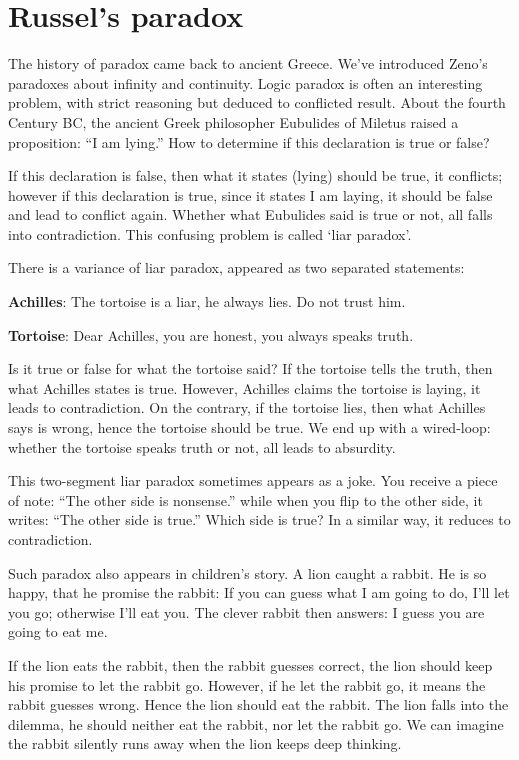 \documentclass[b5paper]{article}
\begin{document}
\section{Russel's paradox}

The history of paradox came back to ancient Greece. We've introduced Zeno's paradoxes about infinity and continuity. Logic paradox is often an interesting problem, with strict reasoning but deduced to conflicted result. About the fourth Century BC, the ancient Greek philosopher Eubulides of Miletus raised a proposition: ``I am lying.'' How to determine if this declaration is true or false?

If this declaration is false, then what it states (lying) should be true, it conflicts; however if this declaration is true, since it states I am laying, it should be false and lead to conflict again. Whether what Eubulides said is true or not, all falls into contradiction. This confusing problem is called `liar paradox'.

There is a variance of liar paradox, appeared as two separated statements:

\textbf{Achilles}: The tortoise is a liar, he always lies. Do not trust him.

\textbf{Tortoise}: Dear Achilles, you are honest, you always speaks truth.

Is it true or false for what the tortoise said? If the tortoise tells the truth, then what Achilles states is true. However, Achilles claims the tortoise is laying, it leads to contradiction. On the contrary, if the tortoise lies, then what Achilles says is wrong, hence the tortoise should be true. We end up with a wired-loop: whether the tortoise speaks truth or not, all leads to absurdity.

This two-segment liar paradox sometimes appears as a joke. You receive a piece of note: ``The other side is nonsense.'' while when you flip to the other side, it writes: ``The other side is true.'' Which side is true? In a similar way, it reduces to contradiction.

Such paradox also appears in children's story. A lion caught a rabbit. He is so happy, that he promise the rabbit: If you can guess what I am going to do, I'll let you go; otherwise I'll eat you. The clever rabbit then answers: I guess you are going to eat me.

If the lion eats the rabbit, then the rabbit guesses correct, the lion should keep his promise to let the rabbit go. However, if he let the rabbit go, it means the rabbit guesses wrong. Hence the lion should eat the rabbit. The lion falls into the dilemma, he should neither eat the rabbit, nor let the rabbit go. We can imagine the rabbit silently runs away when the lion keeps deep thinking.
\end{document}
